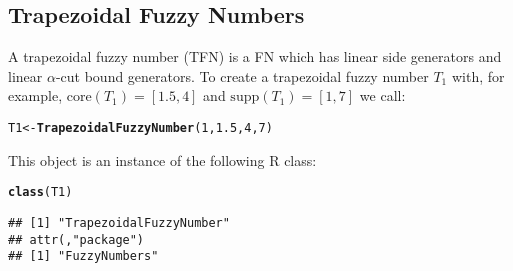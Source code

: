\documentclass[11pt]{article}\usepackage{graphicx, color}
\makeatletter
\newcommand{\hlfunctioncall}[1]{\textcolor[rgb]{0.501960784313725,0,0.329411764705882}{\textbf{#1}}}%
\newenvironment{kframe}{%
 \def\at@end@of@kframe{}%
 \ifinner\ifhmode%
  \def\at@end@of@kframe{\end{minipage}}%
  \begin{minipage}{\columnwidth}%
 \fi\fi%
 \def\FrameCommand##1{\hskip\@totalleftmargin \hskip-\fboxsep
 \colorbox{shadecolor}{##1}\hskip-\fboxsep
     \hskip-\linewidth \hskip-\@totalleftmargin \hskip\columnwidth}%
 \MakeFramed {\advance\hsize-\width
   \@totalleftmargin\z@ \linewidth\hsize
   \@setminipage}}%
 {\par\unskip\endMakeFramed%
 \at@end@of@kframe}
\newenvironment{knitrout}{}{} %
\newcommand{\lang}[1]{\textsf{#1}\xspace}
\newcommand{\R}{\lang{R}}
\makeatother
\begin{document}
% 
% 
% 
% 
% 
% 
% 


\subsection{Trapezoidal Fuzzy Numbers}\label{Sec:TFNdef}

A trapezoidal fuzzy number (TFN) is a FN which has linear
side generators and linear $\alpha$-cut bound generators.
To create a trapezoidal fuzzy number $T_1$
with, for example, $\mathrm{core}(T_1)=[1.5,4]$
and $\mathrm{supp}(T_1)=[1,7]$ we call:

\begin{knitrout}\small
{}\color{fgcolor}\begin{kframe}
\begin{alltt}
T1 <- \hlfunctioncall{TrapezoidalFuzzyNumber}(1,1.5,4,7)
\end{alltt}
\end{kframe}
\end{knitrout}


\noindent
This object is an instance of the following \R class:

\begin{knitrout}\small
{}\color{fgcolor}\begin{kframe}
\begin{alltt}
\hlfunctioncall{class}(T1)
\end{alltt}
\begin{verbatim}
## [1] "TrapezoidalFuzzyNumber"
## attr(,"package")
## [1] "FuzzyNumbers"
\end{verbatim}
\end{kframe}
\end{knitrout}
\end{document}
